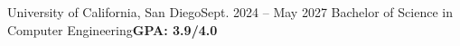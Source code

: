 \resumeSubHeadingListStart
  \resumeSubheading
    {University of California, San Diego}{Sept. 2024 -- May 2027}
    {Bachelor of Science in Computer Engineering}{\textbf{GPA: 3.9/4.0}}
    \resumeItemListStart
    \vspace{-4pt}
    \resumeItemListEnd
\resumeSubHeadingListEnd
